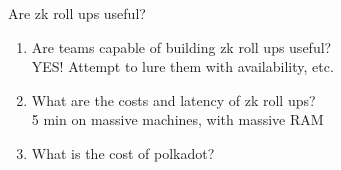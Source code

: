 \documentclass{beamer}
\begin{document}
\begin{frame}
\begin{columns}
\begin{column}[t]{0.3\textwidth}
    \end{column}
\end{columns}

\end{frame}


\begin{frame}{Are zk roll ups useful?}

\begin{enumerate}
\item Are teams capable of building zk roll ups useful? \\
 YES! \quad Attempt to lure them with availability, etc. \\ \medskip
\item What are the costs and latency of zk roll ups? \\
 5 min on massive machines, with massive RAM \\ \medskip
\item What is the cost of polkadot? \\ \medskip
\end{enumerate}

\end{frame}
 
\end{document}
